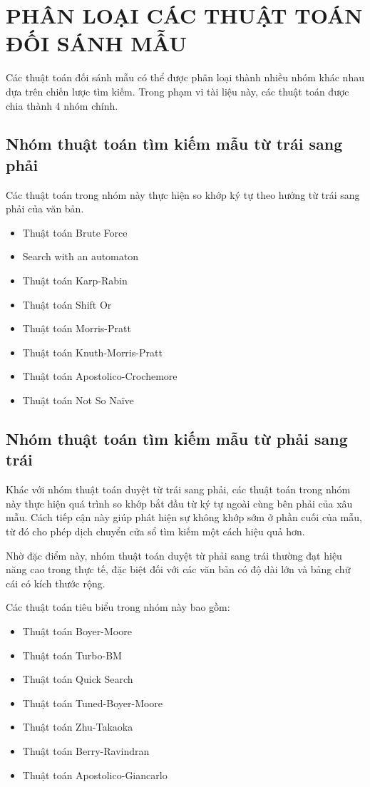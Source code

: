 \chapter{PHÂN LOẠI CÁC THUẬT TOÁN ĐỐI SÁNH MẪU}

Các thuật toán đối sánh mẫu có thể được phân loại thành nhiều nhóm khác nhau dựa trên chiến lược tìm kiếm. Trong phạm vi tài liệu này, các thuật toán được chia thành 4 nhóm chính.

\section{Nhóm thuật toán tìm kiếm mẫu từ trái sang phải}

Các thuật toán trong nhóm này thực hiện so khớp ký tự theo hướng từ trái sang phải của văn bản.

\begin{itemize}
    \item Thuật toán Brute Force
    \item Search with an automaton
    \item Thuật toán Karp-Rabin
    \item Thuật toán Shift Or
    \item Thuật toán Morris-Pratt
    \item Thuật toán Knuth-Morris-Pratt
    \item Thuật toán Apostolico-Crochemore
    \item Thuật toán Not So Naïve
\end{itemize}


\section{Nhóm thuật toán tìm kiếm mẫu từ phải sang trái}

Khác với nhóm thuật toán duyệt từ trái sang phải, các thuật toán trong nhóm này thực hiện quá trình so khớp bắt đầu từ ký tự ngoài cùng bên phải của xâu mẫu. Cách tiếp cận này giúp phát hiện sự không khớp sớm ở phần cuối của mẫu, từ đó cho phép dịch chuyển cửa sổ tìm kiếm một cách hiệu quả hơn.

Nhờ đặc điểm này, nhóm thuật toán duyệt từ phải sang trái thường đạt hiệu năng cao trong thực tế, đặc biệt đối với các văn bản có độ dài lớn và bảng chữ cái có kích thước rộng.

Các thuật toán tiêu biểu trong nhóm này bao gồm:

\begin{itemize}
    \item Thuật toán Boyer-Moore
    \item Thuật toán Turbo-BM
    \item Thuật toán Quick Search
    \item Thuật toán Tuned-Boyer-Moore
    \item Thuật toán Zhu-Takaoka
    \item Thuật toán Berry-Ravindran
    \item Thuật toán Apostolico-Giancarlo
\end{itemize}

